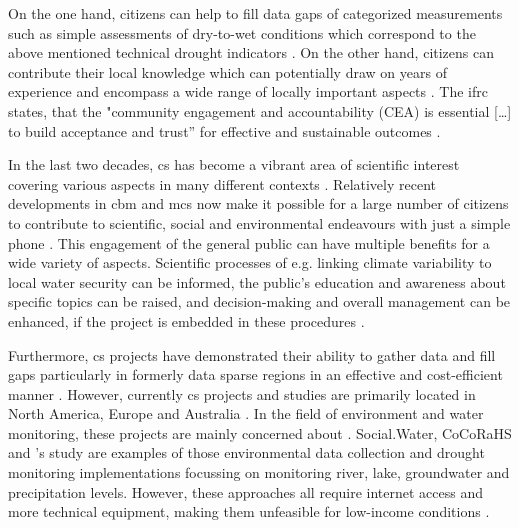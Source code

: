 On the one hand, citizens can help to fill data gaps of categorized measurements such as simple assessments of dry-to-wet conditions which correspond to the above mentioned technical drought indicators \autocite{lackstromBackyardHydroclimatologyCitizen2022}. On the other hand, citizens can contribute their local knowledge which can potentially draw on years of experience and encompass a wide range of locally important aspects \autocite{butteFrameworkWaterSecurity2022,koehlerCitizenParticipationCollaborative2008,njambi-szlapkaIntegratingCommunityVoices}. The \acrshort{ifrc} states, that the "community engagement and accountability (CEA) is essential […] to build acceptance and trust” for effective and sustainable outcomes \autocite{ifrcCommunityEngagementAccountability}.\newline



In the last two decades, \acrlong{cs} has become a vibrant area of scientific interest covering various aspects in many different contexts \autocite{kirschkeCitizenScienceProjects2022,kullenbergWhatCitizenScience2016}. Relatively recent developments in \acrlong{cbm} and \acrlong{mcs} now make it possible for a large number of citizens to contribute to scientific, social and environmental endeavours with just a simple phone \autocite{butteFrameworkWaterSecurity2022}. This engagement of the general public can have multiple benefits for a wide variety of aspects. Scientific processes of e.g. linking climate variability to local water security can be informed, the public's education and awareness about specific topics can be raised, and decision-making and overall management can be enhanced, if the project is embedded in these procedures \autocite{huangManagementDrinkingWater2020,kirschkeCitizenScienceProjects2022,minkmanCitizenScienceWater2015}.


Furthermore, \acrshort{cs} projects have demonstrated their ability to gather data and fill gaps particularly in formerly data sparse regions in an effective and cost-efficient manner \autocite{butteFrameworkWaterSecurity2022,lackstromBackyardHydroclimatologyCitizen2022,weeserCitizenSciencePioneers2018a}. However, currently \acrshort{cs} projects and studies are primarily located in North America, Europe and Australia \autocite{kirschkeCitizenScienceProjects2022, koehlerCitizenParticipationCollaborative2008, livinglakescanadaElevatingCommunityBased2018}. In the field of environment and water monitoring, these projects are mainly concerned about  \autocite{kirschkeCitizenScienceProjects2022}. Social.Water, CoCoRaHS and \autocite{speirSolutionsCurrentChallenges2022}'s study are examples of those environmental data collection and drought monitoring implementations focussing on monitoring river, lake, groundwater and precipitation levels. However, these approaches all require internet access and more technical equipment, making them unfeasible for low-income conditions \autocite{fienenSocialWaterCrowdsourcing2012a,lackstromBackyardHydroclimatologyCitizen2022,lowryGrowingPainsCrowdsourced2019}.\newline


